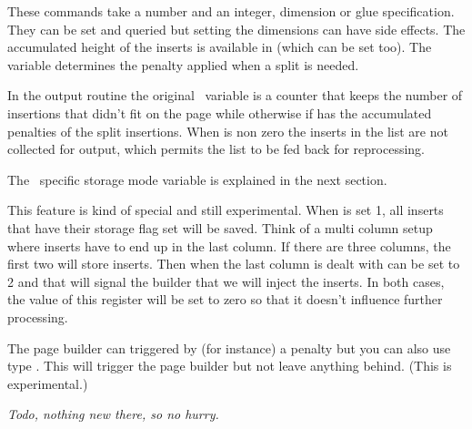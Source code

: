 These commands take a number and an integer, dimension or glue specification.
They can be set and queried but setting the dimensions can have side effects. The
accumulated height of the inserts is available in \type {\insertheights} (which
can be set too). The \type {\floatingpenalty} variable determines the penalty
applied when a split is needed.

In the output routine the original \TEX\ variable \type {\insertpenalties} is a
counter that keeps the number of insertions that didn't fit on the page while
otherwise if has the accumulated penalties of the split insertions. When \type
{\holdinginserts} is non zero the inserts in the list are not collected for
output, which permits the list to be fed back for reprocessing.

The \LUAMETATEX\ specific storage mode \type {\insertstoring} variable is
explained in the next section.

\stopsectionlevel

\startsectionlevel[title=Storing]

This feature is kind of special and still experimental. When \type
{\insertstoring} is set 1, all inserts that have their storage flag set will be
saved. Think of a multi column setup where inserts have to end up in the last
column. If there are three columns, the first two will store inserts. Then when
the last column is dealt with \type {\insertstoring} can be set to 2 and that
will signal the builder that we will inject the inserts. In both cases, the value
of this register will be set to zero so that it doesn't influence further
processing.

\stopsectionlevel

\startsectionlevel[title=Synchronizing]

The page builder can triggered by (for instance) a penalty but you can also use
type {\pageboundary}. This will trigger the page builder but not leave anything
behind. (This is experimental.)

\stopsectionlevel

\startsectionlevel[title=Callbacks]

{\em Todo, nothing new there, so no hurry.}

\stopsectionlevel

\stopdocument
